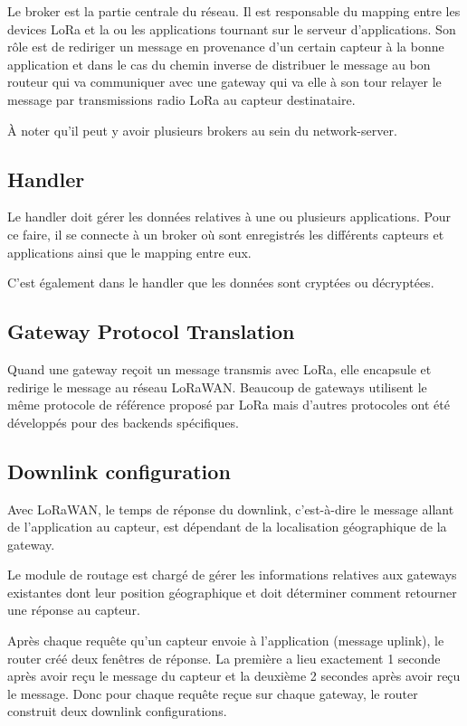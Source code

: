 Le broker est la partie centrale du réseau. Il est responsable du mapping entre les devices LoRa et la ou les applications tournant sur le serveur d'applications. Son rôle est de rediriger un message en provenance d'un certain capteur à la bonne application et dans le cas du chemin inverse de distribuer le message au bon routeur qui va communiquer avec une gateway qui va elle à son tour relayer le message par transmissions radio LoRa au capteur destinataire.

À noter qu'il peut y avoir plusieurs brokers au sein du network-server.

\subsection{Handler}

Le handler doit gérer les données relatives à une ou plusieurs applications. Pour ce faire, il se connecte à un broker où sont enregistrés les différents capteurs et applications ainsi que le mapping entre eux.

C'est également dans le handler que les données sont cryptées ou décryptées.

\subsection{Gateway Protocol Translation}

Quand une gateway reçoit un message transmis avec LoRa, elle encapsule et redirige le message au réseau LoRaWAN. Beaucoup de gateways utilisent le même protocole de référence proposé par LoRa mais d'autres protocoles ont été développés pour des backends spécifiques.

\subsection{Downlink configuration}

Avec LoRaWAN, le temps de réponse du downlink, c'est-à-dire le message allant de l'application au capteur, est dépendant de la localisation géographique de la gateway.

Le module de routage est chargé de gérer les informations relatives aux gateways existantes dont leur position géographique et doit déterminer comment retourner une réponse au capteur.

Après chaque requête qu'un capteur envoie à l'application (message uplink), le router créé deux fenêtres de réponse. La première a lieu exactement 1 seconde après avoir reçu le message du capteur et la deuxième 2 secondes après avoir reçu le message. Donc pour chaque requête reçue sur chaque gateway, le router construit deux downlink configurations.

